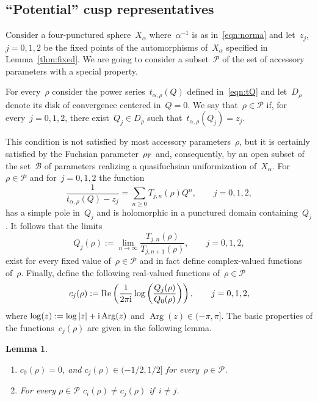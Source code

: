 \documentclass[pdftex]{sigma}
\numberwithin{equation}{section}
\newtheorem{Lemma}[Theorem]{Lemma}
\begin{document}
\subsection{``Potential'' cusp representatives}
Consider a four-punctured sphere~$X_\alpha$ where~$\alpha^{-1}$ is as in~\eqref{eqn:norma} and let~$z_j$, $j=0,1,2$ be the fixed points of the automorphisms of~$X_\alpha$ specified in Lemma~\ref{thm:fixed}.
We are going to consider a subset~$\mathcal{P}$ of the set of accessory parameters with a special property.
\begin{Definition}
For every~$\rho$ consider the power series~$t_{\alpha,\rho}(Q)$ defined in~\eqref{eqn:tQ} and let~$D_\rho$ denote its disk of convergence centered in~$Q=0$. We say that~$\rho\in\mathcal{P}$ if, for every~$j=0,1,2$, there exist~$Q_j\in D_\rho$ such that~$t_{\alpha,\rho}(Q_j)=z_j$.
\end{Definition}
This condition is not satisfied by most accessory parameters~$\rho$, but it is certainly satisfied by the Fuchsian parameter~$\rho_{\rm F}$ and, consequently, by an open subset of the set~$\mathcal{B}$ of parameters realizing a quasifuchsian uniformization of~$X_\alpha$.
For~$\rho\in\mathcal{P}$ and for~$j=0,1,2$ the function
\begin{equation*}%
\frac{1}{t_{\alpha,\rho}(Q)-z_j}=\sum_{n\ge0}{{T}_{j,n}(\rho)Q^n},\qquad j=0,1,2,
\end{equation*}
has a simple pole in~$Q_j$ and is holomorphic in a punctured domain containing~$Q_j$. It follows that the limits
\[
 Q_j(\rho):= \lim_{n\to\infty}{\frac{{T}_{j,n}(\rho)}{{T}_{j,n+1}(\rho)}} ,\qquad j=0,1,2 ,
\]
exist for every fixed value of~$\rho\in\mathcal{P}$ and in fact define complex-valued functions of~$\rho$.
Finally, define the following real-valued functions of~$\rho\in\mathcal{P}$
\begin{equation*}
c_j(\rho):=\operatorname{Re}\left(\frac{1}{2\pi {\rm i}}\log\left(\frac{Q_j(\rho)}{Q_0(\rho)}\right)\right),\qquad j=0,1,2,
\end{equation*}
where $\log(z):=\log|z|+{\rm i}\operatorname{Arg}(z)$ and $\operatorname{Arg}(z)\in(-\pi,\pi]$.
The basic properties of the functions~$c_j(\rho)$ are given in the following lemma.
\begin{Lemma}\quad
\begin{enumerate}\itemsep=0pt
\item[$1.$] $c_0(\rho)= 0$, and $c_j(\rho)\in (-1/2,1/2]$ for every~$\rho\in\mathcal{P}$.
\item[$2.$] For every $\rho\in\mathcal{P}$ $c_i(\rho)\neq c_j(\rho)$ if~$i\neq j$.
\end{enumerate}
\end{Lemma}
\end{document}
